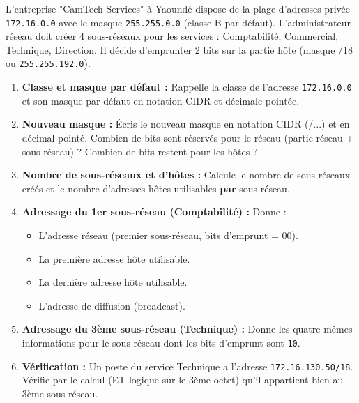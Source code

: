 \documentclass[11pt]{article}
\begin{document}
\begin{exercice}
L'entreprise "CamTech Services" à Yaoundé dispose de la plage d'adresses privée \texttt{172.16.0.0} avec le masque \texttt{255.255.0.0} (classe B par défaut). L'administrateur réseau doit créer 4 sous-réseaux pour les services : Comptabilité, Commercial, Technique, Direction. Il décide d'emprunter 2 bits sur la partie hôte (masque /18 ou \texttt{255.255.192.0}).

\begin{enumerate}
    \item \textbf{Classe et masque par défaut :} Rappelle la classe de l'adresse \texttt{172.16.0.0} et son masque par défaut en notation CIDR et décimale pointée.
    \item \textbf{Nouveau masque :} Écris le nouveau masque en notation CIDR (/...) et en décimal pointé. Combien de bits sont réservés pour le réseau (partie réseau + sous-réseau) ? Combien de bits restent pour les hôtes ?
    \item \textbf{Nombre de sous-réseaux et d'hôtes :} Calcule le nombre de sous-réseaux créés et le nombre d'adresses hôtes utilisables \textbf{par} sous-réseau.
    \item \textbf{Adressage du 1er sous-réseau (Comptabilité) :} Donne :
    \begin{itemize}
        \item L'adresse réseau (premier sous-réseau, bits d'emprunt = 00).
        \item La première adresse hôte utilisable.
        \item La dernière adresse hôte utilisable.
        \item L'adresse de diffusion (broadcast).
    \end{itemize}
    \item \textbf{Adressage du 3ème sous-réseau (Technique) :} Donne les quatre mêmes informations pour le sous-réseau dont les bits d'emprunt sont \texttt{10}.
    \item \textbf{Vérification :} Un poste du service Technique a l'adresse \texttt{172.16.130.50/18}. Vérifie par le calcul (ET logique sur le 3ème octet) qu'il appartient bien au 3ème sous-réseau.
\end{enumerate}
\end{exercice}
\end{document}
